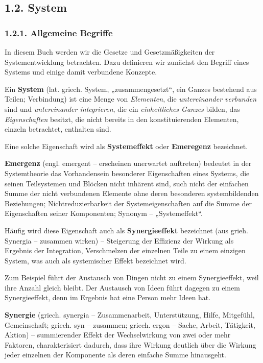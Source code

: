 \documentclass[11pt,a4paper]{article}
\begin{document}
\subsection*{1.2. System}
\subsubsection*{1.2.1. Allgemeine Begriffe}

In diesem Buch werden wir die Gesetze und Gesetzmäßigkeiten der
Systementwicklung betrachten.  Dazu definieren wir zunächst den Begriff eines
Systems und einige damit verbundene Konzepte.

Ein \textbf{System} (lat. griech. System, „zusammengesetzt“, ein Ganzes
bestehend aus Teilen; Verbindung) ist eine Menge von \emph{Elementen}, die
\emph{untereinander verbunden} sind und \emph{untereinander integrieren}, die
ein \emph{einheitliches Ganzes} bilden, das \emph{Eigenschaften} besitzt, die
nicht bereits in den konstituierenden Elementen, einzeln betrachtet, enthalten
sind.

Eine solche Eigenschaft wird als \textbf{Systemeffekt} oder \textbf{Emeregenz}
bezeichnet.

\textbf{Emergenz} (engl. emergent -- erscheinen unerwartet auftreten) bedeutet
in der Systemtheorie das Vorhandensein besonderer Eigenschaften eines Systems,
die seinen Teilsystemen und Blöcken nicht inhärent sind, such nicht der
einfachen Summe der nicht verbundenen Elemente ohne deren besonderen
systembildenden Beziehungen; Nichtreduzierbarkeit der Systemeigenschaften auf
die Summe der Eigenschaften seiner Komponenten; Synonym -- „Systemeffekt“.

Häufig wird diese Eigenschaft auch als \textbf{Synergieeffekt} bezeichnet (aus
grieh. Synergia -- zusammen wirken) -- Steigerung der Effizienz der Wirkung als
Ergebnis der Integration, Verschmelzen der einzelnen Teile zu einem einzigen
System, was auch als systemischer Effekt bezeichnet wird.

Zum Beispiel führt der Austausch von Dingen nicht zu einem Synergieeffekt,
weil ihre Anzahl gleich bleibt. Der Austausch von Ideen führt dagegen zu einem
Synergieeffekt, denn im Ergebnis hat eine Person mehr Ideen hat.

\textbf{Synergie} (griech. synergia -- Zusammenarbeit, Unterstützung, Hilfe,
Mitgefühl, Gemeinschaft; griech. syn -- zusammen; griech. ergon -- Sache,
Arbeit, Tätigkeit, Aktion) -- summierender Effekt der Wechselwirkung von zwei
oder mehr Faktoren, charakterisiert dadurch, dass ihre Wirkung deutlich über
die Wirkung jeder einzelnen der Komponente als deren einfache Summe
hinausgeht.
\end{document}
